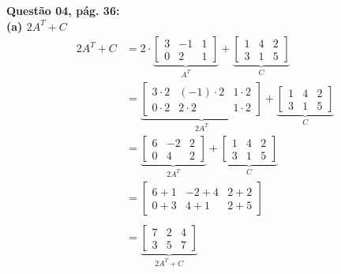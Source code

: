 \documentclass[a4paper,12pt]{article}
\begin{document}
\textbf{Questão 04, pág. 36:}\\
\textbf{(a) $2A^{T} + C$}
\begin{align*}
2A^{T} + C&=
    2 \cdot
    \underbrace{
    \begin{bmatrix}
        3 & -1 & 1\\
        0 & 2 & 1
    \end{bmatrix}}_{A^{T}} 
    +
    \underbrace{
    \begin{bmatrix}
        1 & 4 & 2 \\
        3 & 1 & 5
    \end{bmatrix}}_{C} \\
    &=
    \underbrace{
    \begin{bmatrix}
        3 \cdot 2 & (-1) \cdot 2 & 1 \cdot 2\\
        0 \cdot 2 & 2 \cdot 2 & 1 \cdot 2
    \end{bmatrix}}_{2A^{T}}
    +
    \underbrace{
    \begin{bmatrix}
        1 & 4 & 2 \\
        3 & 1 & 5
    \end{bmatrix}}_{C} \\
    &=
    \underbrace{
    \begin{bmatrix}
        6 & -2 & 2\\
        0 & 4 & 2
    \end{bmatrix}}_{2A^{T}}
    +
    \underbrace{
    \begin{bmatrix}
        1 & 4 & 2 \\
        3 & 1 & 5
    \end{bmatrix}}_{C} \\
    &=
    \begin{bmatrix}
        6 + 1 & -2 + 4 & 2 + 2\\
        0 + 3 & 4 + 1 & 2 + 5
    \end{bmatrix} \\ \\
    &=
    \underbrace{
    \begin{bmatrix}
        7 & 2 & 4\\
        3 & 5 & 7
    \end{bmatrix}}_{2A^{T} + C}
\end{align*}
\end{document}

